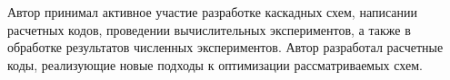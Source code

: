 
{\contribution} Автор принимал активное участие разработке каскадных схем, написании расчетных кодов, проведении вычислительных экспериментов, а также в обработке результатов численных экспериментов. Автор разработал расчетные коды, реализующие новые подходы к оптимизации рассматриваемых схем.


